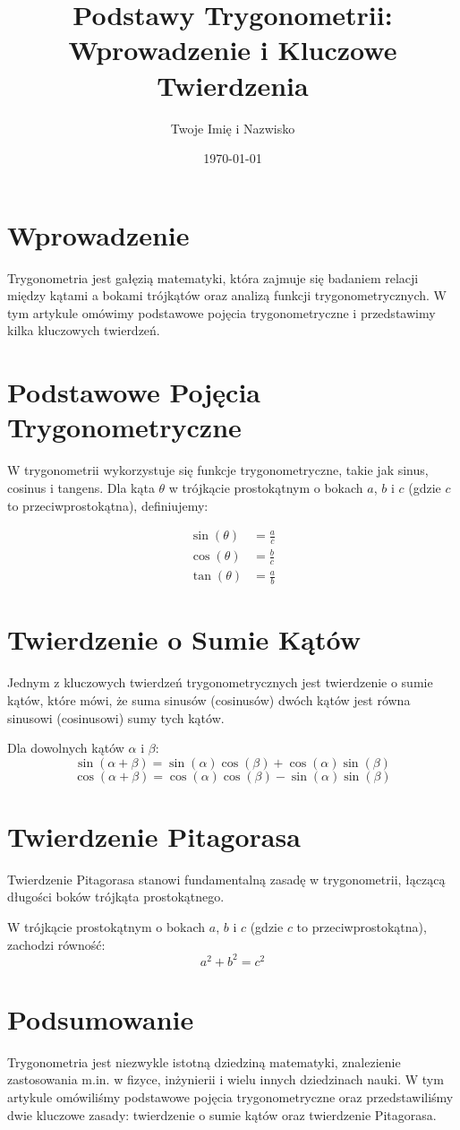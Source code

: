 \documentclass[12pt]{article}
\title{Podstawy Trygonometrii: Wprowadzenie i Kluczowe Twierdzenia}
\author{Twoje Imię i Nazwisko}
\date{\today}
\begin{document}
\maketitle

\section{Wprowadzenie}
Trygonometria jest gałęzią matematyki, która zajmuje się badaniem relacji między kątami a bokami trójkątów oraz analizą funkcji trygonometrycznych. W tym artykule omówimy podstawowe pojęcia trygonometryczne i przedstawimy kilka kluczowych twierdzeń.

\section{Podstawowe Pojęcia Trygonometryczne}
W trygonometrii wykorzystuje się funkcje trygonometryczne, takie jak sinus, cosinus i tangens. Dla kąta $\theta$ w trójkącie prostokątnym o bokach $a$, $b$ i $c$ (gdzie $c$ to przeciwprostokątna), definiujemy:

\begin{align*}
\sin(\theta) &= \frac{a}{c} \\
\cos(\theta) &= \frac{b}{c} \\
\tan(\theta) &= \frac{a}{b}
\end{align*}

\section{Twierdzenie o Sumie Kątów}
Jednym z kluczowych twierdzeń trygonometrycznych jest twierdzenie o sumie kątów, które mówi, że suma sinusów (cosinusów) dwóch kątów jest równa sinusowi (cosinusowi) sumy tych kątów.

\begin{theorem}
Dla dowolnych kątów $\alpha$ i $\beta$:
\[
\sin(\alpha + \beta) = \sin(\alpha)\cos(\beta) + \cos(\alpha)\sin(\beta)
\]
\[
\cos(\alpha + \beta) = \cos(\alpha)\cos(\beta) - \sin(\alpha)\sin(\beta)
\]
\end{theorem}

\section{Twierdzenie Pitagorasa}
Twierdzenie Pitagorasa stanowi fundamentalną zasadę w trygonometrii, łączącą długości boków trójkąta prostokątnego.

\begin{theorem}
W trójkącie prostokątnym o bokach $a$, $b$ i $c$ (gdzie $c$ to przeciwprostokątna), zachodzi równość:
\[
a^2 + b^2 = c^2
\]
\end{theorem}

\section{Podsumowanie}
Trygonometria jest niezwykle istotną dziedziną matematyki, znalezienie zastosowania m.in. w fizyce, inżynierii i wielu innych dziedzinach nauki. W tym artykule omówiliśmy podstawowe pojęcia trygonometryczne oraz przedstawiliśmy dwie kluczowe zasady: twierdzenie o sumie kątów oraz twierdzenie Pitagorasa.
\end{document}
